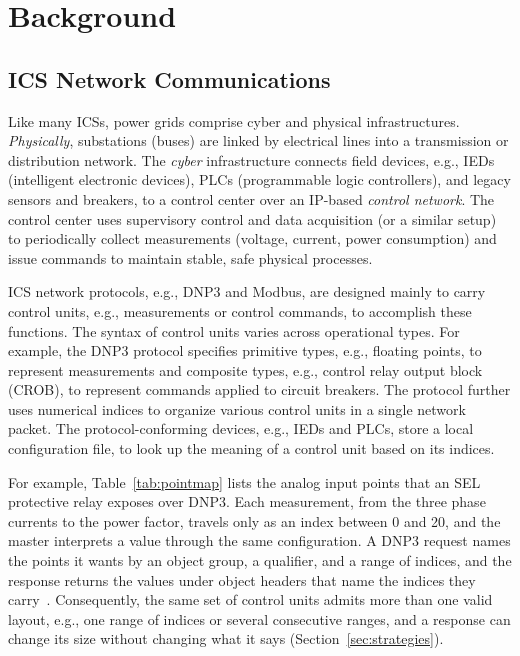 \section{Background}
\label{sec:background}

\subsection{ICS Network Communications}
Like many ICSs, power grids comprise cyber and physical infrastructures. \textit{Physically}, substations (buses) are linked by electrical lines into a transmission or distribution network. The \textit{cyber} infrastructure connects field devices, e.g., IEDs (intelligent electronic devices), PLCs (programmable logic controllers), and legacy sensors and breakers, to a control center over an IP-based \textit{control network}. The control center uses supervisory control and data acquisition (or a similar setup) to periodically collect measurements (voltage, current, power consumption) and issue commands to maintain stable, safe physical processes.

ICS network protocols, e.g., DNP3 and Modbus, are designed mainly to carry control units, e.g., measurements or control commands, to accomplish these functions. The syntax of control units varies across operational types. For example, the DNP3 protocol specifies primitive types, e.g., floating points, to represent measurements and composite types, e.g., control relay output block (CROB), to represent commands applied to circuit breakers. The protocol further uses numerical indices to organize various control units in a single network packet. The protocol-conforming devices, e.g., IEDs and PLCs, store a local configuration file, to look up the meaning of a control unit based on its indices.

For example, Table~\ref{tab:pointmap} lists the analog input points that an SEL protective relay exposes over DNP3. Each measurement, from the three phase currents to the power factor, travels only as an index between 0 and 20, and the master interprets a value through the same configuration. A DNP3 request names the points it wants by an object group, a qualifier, and a range of indices, and the response returns the values under object headers that name the indices they carry~\cite{dnp3std}. Consequently, the same set of control units admits more than one valid layout, e.g., one range of indices or several consecutive ranges, and a response can change its size without changing what it says (Section~\ref{sec:strategies}).


